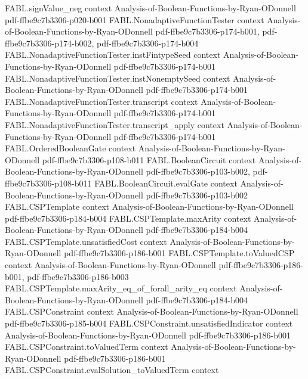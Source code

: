 \begin{theorem}
\proofstep
  {FABL.signValue_neg}
  {context}
  {Analysis-of-Boolean-Functions-by-Ryan-ODonnell}
  {pdf-ffbe9c7b3306-p020-b001}
\proofstep
  {FABL.NonadaptiveFunctionTester}
  {context}
  {Analysis-of-Boolean-Functions-by-Ryan-ODonnell}
  {pdf-ffbe9c7b3306-p174-b001,
    pdf-ffbe9c7b3306-p174-b002,
    pdf-ffbe9c7b3306-p174-b004}
\proofstep
  {FABL.NonadaptiveFunctionTester.instFintypeSeed}
  {context}
  {Analysis-of-Boolean-Functions-by-Ryan-ODonnell}
  {pdf-ffbe9c7b3306-p174-b001}
\proofstep
  {FABL.NonadaptiveFunctionTester.instNonemptySeed}
  {context}
  {Analysis-of-Boolean-Functions-by-Ryan-ODonnell}
  {pdf-ffbe9c7b3306-p174-b001}
\proofstep
  {FABL.NonadaptiveFunctionTester.transcript}
  {context}
  {Analysis-of-Boolean-Functions-by-Ryan-ODonnell}
  {pdf-ffbe9c7b3306-p174-b001}
\proofstep
  {FABL.NonadaptiveFunctionTester.transcript_apply}
  {context}
  {Analysis-of-Boolean-Functions-by-Ryan-ODonnell}
  {pdf-ffbe9c7b3306-p174-b001}
\proofstep
  {FABL.OrderedBooleanGate}
  {context}
  {Analysis-of-Boolean-Functions-by-Ryan-ODonnell}
  {pdf-ffbe9c7b3306-p108-b011}
\proofstep
  {FABL.BooleanCircuit}
  {context}
  {Analysis-of-Boolean-Functions-by-Ryan-ODonnell}
  {pdf-ffbe9c7b3306-p103-b002,
    pdf-ffbe9c7b3306-p108-b011}
\proofstep
  {FABL.BooleanCircuit.evalGate}
  {context}
  {Analysis-of-Boolean-Functions-by-Ryan-ODonnell}
  {pdf-ffbe9c7b3306-p103-b002}
\proofstep
  {FABL.CSPTemplate}
  {context}
  {Analysis-of-Boolean-Functions-by-Ryan-ODonnell}
  {pdf-ffbe9c7b3306-p184-b004}
\proofstep
  {FABL.CSPTemplate.maxArity}
  {context}
  {Analysis-of-Boolean-Functions-by-Ryan-ODonnell}
  {pdf-ffbe9c7b3306-p184-b004}
\proofstep
  {FABL.CSPTemplate.unsatisfiedCost}
  {context}
  {Analysis-of-Boolean-Functions-by-Ryan-ODonnell}
  {pdf-ffbe9c7b3306-p186-b001}
\proofstep
  {FABL.CSPTemplate.toValuedCSP}
  {context}
  {Analysis-of-Boolean-Functions-by-Ryan-ODonnell}
  {pdf-ffbe9c7b3306-p186-b001,
    pdf-ffbe9c7b3306-p186-b003}
\proofstep
  {FABL.CSPTemplate.maxArity_eq_of_forall_arity_eq}
  {context}
  {Analysis-of-Boolean-Functions-by-Ryan-ODonnell}
  {pdf-ffbe9c7b3306-p184-b004}
\proofstep
  {FABL.CSPConstraint}
  {context}
  {Analysis-of-Boolean-Functions-by-Ryan-ODonnell}
  {pdf-ffbe9c7b3306-p185-b004}
\proofstep
  {FABL.CSPConstraint.unsatisfiedIndicator}
  {context}
  {Analysis-of-Boolean-Functions-by-Ryan-ODonnell}
  {pdf-ffbe9c7b3306-p186-b001}
\proofstep
  {FABL.CSPConstraint.toValuedTerm}
  {context}
  {Analysis-of-Boolean-Functions-by-Ryan-ODonnell}
  {pdf-ffbe9c7b3306-p186-b001}
\proofstep
  {FABL.CSPConstraint.evalSolution_toValuedTerm}
  {context}

\end{theorem}

